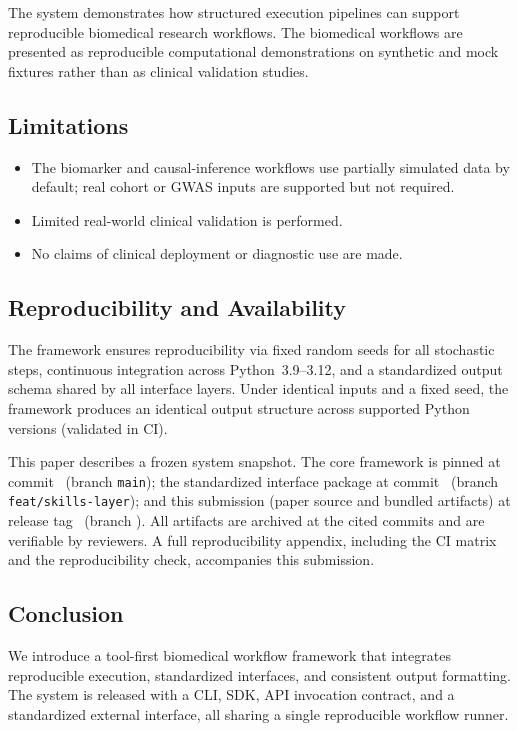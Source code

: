 The system demonstrates how structured execution pipelines can support reproducible biomedical research workflows. The biomedical workflows are presented as reproducible computational demonstrations on synthetic and mock fixtures rather than as clinical validation studies.

\subsection{Limitations}
\begin{itemize}
    \item The biomarker and causal-inference workflows use partially simulated data by default; real cohort or GWAS inputs are supported but not required.
    \item Limited real-world clinical validation is performed.
    \item No claims of clinical deployment or diagnostic use are made.
\end{itemize}

\subsection{Reproducibility and Availability}
\label{sec:repro}
The framework ensures reproducibility via fixed random seeds for all stochastic steps, continuous integration across Python~3.9--3.12, and a standardized output schema shared by all interface layers. Under identical inputs and a fixed seed, the framework produces an identical output structure across supported Python versions (validated in CI).

This paper describes a frozen system snapshot. The core framework is pinned at commit~\texttt{\corecommit} (branch \texttt{main}); the standardized interface package at commit~\texttt{\skillcommit} (branch \texttt{feat/skills-layer}); and this submission (paper source and bundled artifacts) at release tag~\texttt{\releasetag} (branch \texttt{\papersub}). All artifacts are archived at the cited commits and are verifiable by reviewers. A full reproducibility appendix, including the CI matrix and the reproducibility check, accompanies this submission.

\subsection{Conclusion}
We introduce a tool-first biomedical workflow framework that integrates reproducible execution, standardized interfaces, and consistent output formatting. The system is released with a CLI, SDK, API invocation contract, and a standardized external interface, all sharing a single reproducible workflow runner.
